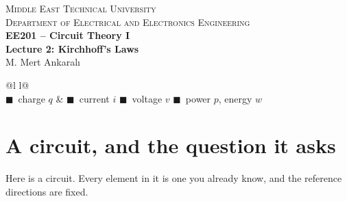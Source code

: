 \documentclass[11pt,a4paper]{article}
\newcommand{\Icol}[1]{\textcolor{ccur}{#1}}
\newcommand{\Vcol}[1]{\textcolor{cvolt}{#1}}
\newcommand{\Pcol}[1]{\textcolor{cpow}{#1}}
\newcommand{\Qcol}[1]{\textcolor{ccharge}{#1}}
\begin{document}
\begin{center}
\begin{tcolorbox}[enhanced, colback=metured!5, colframe=metured, boxrule=1pt,
                  arc=3pt, left=10pt,right=10pt,top=7pt,bottom=7pt, width=\textwidth]
\begin{center}
  {\small\scshape Middle East Technical University}\\[2pt]
  {\small\scshape Department of Electrical and Electronics Engineering}\\[7pt]
  {\Large\bfseries\color{metured} EE201 -- Circuit Theory I}\\[4pt]
  {\large\bfseries Lecture 2: Kirchhoff's Laws}\\[6pt]
  {\small M. Mert Ankaralı}
\end{center}
\end{tcolorbox}
\end{center}
\vspace{-0.5em}

\begin{center}
\small
\begin{tabular}{@{}l l@{}}
\toprule
{}\\
\midrule
\Qcol{$\blacksquare$}~charge $q$ & \Icol{$\blacksquare$}~current $i$ \quad
\Vcol{$\blacksquare$}~voltage $v$ \quad \Pcol{$\blacksquare$}~power $p$, energy $w$\\
\bottomrule
\end{tabular}
\end{center}

\section{A circuit, and the question it asks}

Here is a circuit. Every element in it is one you already know, and the reference
directions are fixed.
\end{document}
